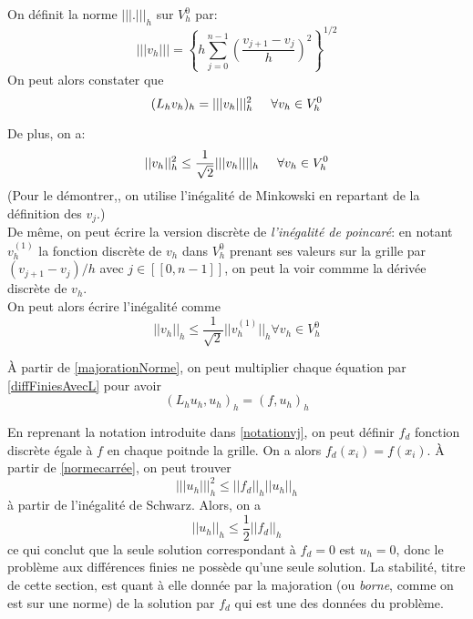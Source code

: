 \documentclass[12pt]{article}
\newcommand{\espace}{\hspace{5mm}}
\begin{document}
On définit la norme $|||.|||_h$ sur $V_h^0$ par:
\begin{equation}
	|||v_h||| = \left\{ h \sum_{j = 0}^{n-1} ( \frac{v_{j+1} - v_j}{h})^2 \right\} ^{1/2}
 \end{equation}
On peut alors constater que
\begin{equation} \label{normecarrée}
	(L_h v_h)_h = |||v_h|||^2_h \espace \forall v_h \in V^0_h
\end{equation}

De plus, on a:
\begin{equation} \label{majorationNorme}
	||v_h||_h^2 \le \frac{1}{\sqrt{2}} |||v_h||||_h \espace \forall v_h \in V_h^0
\end{equation}
(Pour le démontrer,, on utilise l'inégalité de Minkowski en repartant de la définition des $v_j$.)\\
De même, on peut écrire la version discrète de \emph{l'inégalité de poincaré}: en notant $v_h^{(1)}$ la fonction discrète de $v_h$ dans $V_h^0$ prenant ses valeurs sur la grille par $(v_{j+1}-v_j)/h$ avec $j \in [[0, n-1]]$, on peut la voir commme la dérivée discrète de $v_h$.\\
On peut alors écrire l'inégalité comme
\begin{equation}
	||v_h||_h \le \frac{1}{\sqrt{2}} ||v_h^{(1)}||_h \forall v_h \in V_h^0
\end{equation}

À partir de \eqref{majorationNorme}, on peut multiplier chaque équation par \eqref{diffFiniesAvecL} pour avoir
\begin{equation}
	(L_h u_h , u_h )_h = (f, u_h)_h
\end{equation}

En reprenant la notation introduite dans \eqref{notationvj}, on peut définir $f_d$ fonction discrète égale à $f$ en chaque poitnde la grille. On a alors $f_d(x_i) = f(x_i)$.  À partir de \eqref{normecarrée}, on peut trouver
\begin{equation}
|||u_h|||_h^2 \le ||f_d||_h ||u_h||_h
\end{equation}
à partir de l'inégalité de Schwarz.
Alors,  on a 
\begin{equation} \label{preuveStabilité}
||u_h||_h \le \frac{1}{2}||f_d||_h
\end{equation}
ce qui conclut que la seule solution correspondant à $f_d = 0$ est $u_h = 0$, donc le problème aux différences finies ne possède qu'une seule solution. La stabilité, titre de cette section, est quant à elle donnée par la majoration (ou \emph{borne}, comme on est sur une norme) de la solution par $f_d$ qui est une des données du problème.
\end{document}
